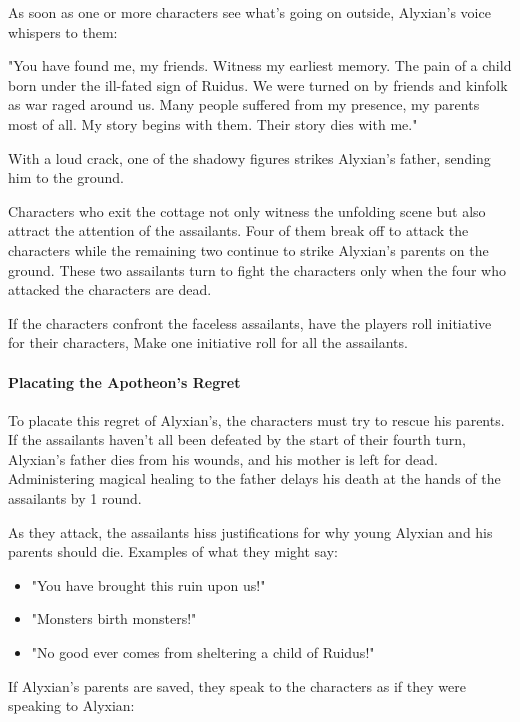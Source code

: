 \documentclass[10pt,a4paper,twoside,twocolumn,openany,nodeprecatedcode]{dndbook}
\begin{document}
As soon as one or more characters see what's going on outside, Alyxian's voice whispers to them:

\begin{DndReadAloud}{}
"You have found me, my friends. Witness my earliest memory. The pain of a child born under the ill-fated sign of Ruidus. We were turned on by friends and kinfolk as war raged around us. Many people suffered from my presence, my parents most of all. My story begins with them. Their story dies with me."

With a loud crack, one of the shadowy figures strikes Alyxian's father, sending him to the ground.

\end{DndReadAloud}

Characters who exit the cottage not only witness the unfolding scene but also attract the attention of the assailants. Four of them break off to attack the characters while the remaining two continue to strike Alyxian's parents on the ground. These two assailants turn to fight the characters only when the four who attacked the characters are dead.

If the characters confront the faceless assailants, have the players roll initiative for their characters, Make one initiative roll for all the assailants.

\paragraph{Placating the Apotheon's Regret}
To placate this regret of Alyxian's, the characters must try to rescue his parents. If the assailants haven't all been defeated by the start of their fourth turn, Alyxian's father dies from his wounds, and his mother is left for dead. Administering magical healing to the father delays his death at the hands of the assailants by 1 round.

As they attack, the assailants hiss justifications for why young Alyxian and his parents should die. Examples of what they might say:


\begin{itemize}
\item "You have brought this ruin upon us!"
\item "Monsters birth monsters!"
\item "No good ever comes from sheltering a child of Ruidus!"
\end{itemize}

If Alyxian's parents are saved, they speak to the characters as if they were speaking to Alyxian:
\end{document}
